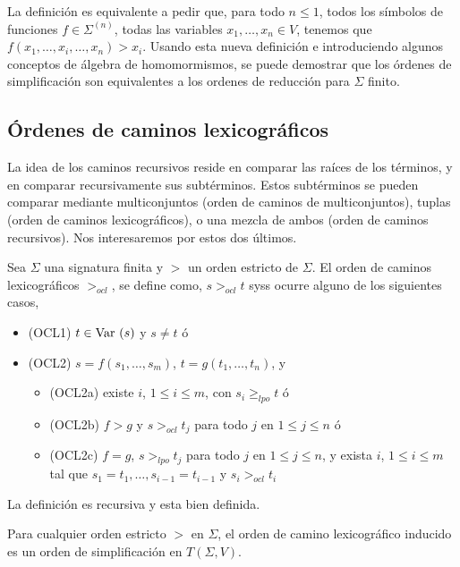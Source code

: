 La definición es equivalente a pedir que, para todo $n \leq 1$, todos
los símbolos de funciones $f \in \Sigma^{(n)}$, todas las variables
$x_1, \dots, x_n \in V$, tenemos que
$f(x_1, \dots, x_i, \dots, x_n) > x_i$. Usando esta nueva definición e
introduciendo algunos conceptos de álgebra de homomormismos, se puede
demostrar que los órdenes de simplificación son equivalentes a los
ordenes de reducción para $\Sigma$ finito.

\subsection{Órdenes de caminos lexicográficos}

La idea de los caminos recursivos reside en comparar las raíces de los
términos, y en comparar recursivamente sus subtérminos. Estos
subtérminos se pueden comparar mediante multiconjuntos (orden de
caminos de multiconjuntos), tuplas (orden de caminos lexicográficos),
o una mezcla de ambos (orden de caminos recursivos). Nos interesaremos
por estos dos últimos.

\begin{defi}
  Sea $\Sigma$ una signatura finita y $>$ un orden estricto de
  $\Sigma$. El orden de caminos lexicográficos $>_{ocl}$, se define
  como, $s>_{ocl}t$ syss ocurre alguno de los siguientes casos,
  \begin{itemize}
  \item (OCL1) $t \in \mbox{Var }(s)$ y $s \not = t$ ó
  \item (OCL2) $s = f(s_1, \dots, s_m)$, $t = g(t_1, \dots, t_n)$, y
    \begin{itemize}
    \item (OCL2a) existe $i$, $1 \leq i \leq m$, con
      $s_i \geq_{lpo} t$ ó
    \item (OCL2b) $f > g$ y $s >_{ocl} t_j$ para todo $j$ en
      $1 \leq j \leq n$ ó
    \item (OCL2c) $f = g$, $s >_{lpo} t_j$ para todo $j$ en
      $1 \leq j \leq n$, y exista $i$, $1 \leq i \leq m$ tal que
      $s_1 = t_1, \dots, s_{i-1} = t_{i-1}$ y $s_i >_{ocl} t_i$
    \end{itemize}
  \end{itemize}
\end{defi}

La definición es recursiva y esta bien definida.


\begin{teor}
  Para cualquier orden estricto $>$ en $\Sigma$, el orden de camino
  lexicográfico inducido es un orden de simplificación en
  $T(\Sigma, V)$.
\end{teor}

